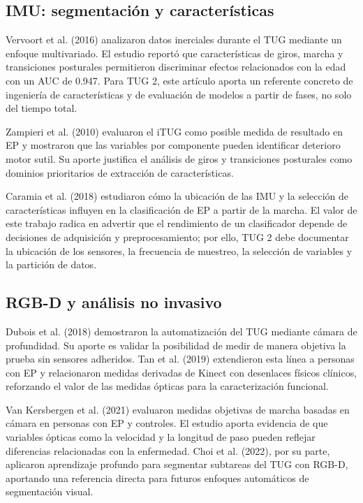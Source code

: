 \documentclass[12pt,a4paper]{article}
\begin{document}
\subsection{IMU: segmentación y características}\label{sec:ea-imu}

Vervoort et al. (2016) analizaron datos inerciales durante el TUG mediante un enfoque multivariado. El estudio reportó que características de giros, marcha y transiciones posturales permitieron discriminar efectos relacionados con la edad con un AUC de 0.947. Para TUG 2, este artículo aporta un referente concreto de ingeniería de características y de evaluación de modelos a partir de fases, no solo del tiempo total.

Zampieri et al. (2010) evaluaron el iTUG como posible medida de resultado en EP y mostraron que las variables por componente pueden identificar deterioro motor sutil. Su aporte justifica el análisis de giros y transiciones posturales como dominios prioritarios de extracción de características.

Caramia et al. (2018) estudiaron cómo la ubicación de las IMU y la selección de características influyen en la clasificación de EP a partir de la marcha. El valor de este trabajo radica en advertir que el rendimiento de un clasificador depende de decisiones de adquisición y preprocesamiento; por ello, TUG 2 debe documentar la ubicación de los sensores, la frecuencia de muestreo, la selección de variables y la partición de datos.

\subsection{RGB-D y análisis no invasivo}\label{sec:ea-rgbd}

Dubois et al. (2018) demostraron la automatización del TUG mediante cámara de profundidad. Su aporte es validar la posibilidad de medir de manera objetiva la prueba sin sensores adheridos. Tan et al. (2019) extendieron esta línea a personas con EP y relacionaron medidas derivadas de Kinect con desenlaces físicos clínicos, reforzando el valor de las medidas ópticas para la caracterización funcional.

Van Kersbergen et al. (2021) evaluaron medidas objetivas de marcha basadas en cámara en personas con EP y controles. El estudio aporta evidencia de que variables ópticas como la velocidad y la longitud de paso pueden reflejar diferencias relacionadas con la enfermedad. Choi et al. (2022), por su parte, aplicaron aprendizaje profundo para segmentar subtareas del TUG con RGB-D, aportando una referencia directa para futuros enfoques automáticos de segmentación visual.
\end{document}
